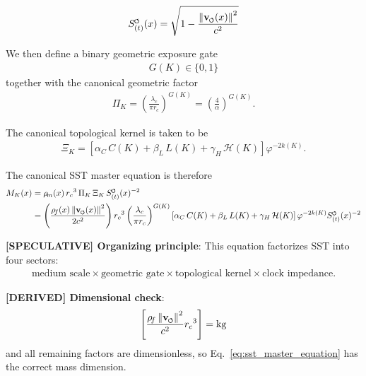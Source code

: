 \documentclass[11pt]{article}
\theoremstyle{definition}
\theoremstyle{plain}
\theoremstyle{remark}
\newcommand{\swirlarrow}{\mathchoice{\mkern-2mu\scriptstyle\boldsymbol{\circlearrowleft}}{\mkern-2mu\scriptstyle\boldsymbol{\circlearrowleft}}{\mkern-2mu\scriptscriptstyle\boldsymbol{\circlearrowleft}}{\mkern-2mu\scriptscriptstyle\boldsymbol{\circlearrowleft}}}
\newcommand{\vswirl}{\mathbf{v}_{\swirlarrow}}
\newcommand{\rhoF}{{\rho_{\!f}}}
\newcommand{\rhoM}{\rho_{\!m}}
\newcommand{\SwirlClock}{{S_{(t)}^{\swirlarrow}}}
\newcommand{\rc}{{r_c}}
\begin{document}
        \begin{align}
            \SwirlClock(x) = \sqrt{1 - \frac{\norm{\vswirl(x)}^2}{c^2}}
        \end{align}

        We then define a binary geometric exposure gate
        \begin{align}
            G(K) \in \{0,1\}
        \end{align}
        together with the canonical geometric factor
        \begin{align}
            \Pi_K = \left( \frac{\lambda_c}{\pi \rc} \right)^{G(K)} = \left( \frac{4}{\alpha} \right)^{G(K)} .
        \end{align}

        The canonical topological kernel is taken to be
        \begin{align}
            \Xi_K = \left[ \alpha_C\,C(K) + \beta_L\,L(K) + \gamma_H\,\mathcal{H}(K) \right] \varphi^{-2k(K)} .
        \end{align}

        The canonical SST master equation is therefore
        \begin{align}
            M_K(x)
            &= \rhoM(x)\,\rc^3\,\Pi_K\,\Xi_K\,\SwirlClock(x)^{-2} \\
            &= \left( \frac{\rhoF(x)\,\norm{\vswirl(x)}^2}{2c^2} \right)
               \rc^3
               \left( \frac{\lambda_c}{\pi \rc} \right)^{G(K)}
               \left[ \alpha_C\,C(K) + \beta_L\,L(K) + \gamma_H\,\mathcal{H}(K) \right]
               \varphi^{-2k(K)}
               \SwirlClock(x)^{-2}
            \label{eq:sst_master_equation}
        \end{align}

        \textbf{[SPECULATIVE] Organizing principle}: This equation factorizes SST into four sectors:
        \begin{align}
            \text{medium scale} \times \text{geometric gate} \times \text{topological kernel} \times \text{clock impedance} .
        \end{align}

        \textbf{[DERIVED] Dimensional check}:
        \begin{align}
            \left[ \frac{\rhoF\,\norm{\vswirl}^2}{c^2} \rc^3 \right] = \mathrm{kg}
        \end{align}
        and all remaining factors are dimensionless, so Eq.~\ref{eq:sst_master_equation} has the correct mass dimension.
\end{document}
